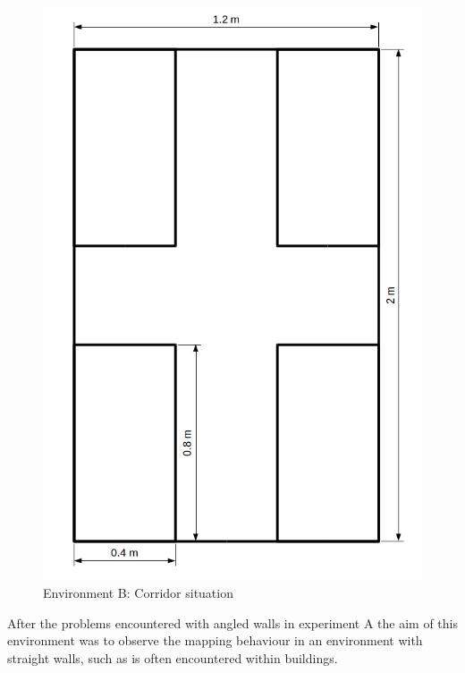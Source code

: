\begin{figure}[h]
\centering
\includegraphics[scale=0.4]{Chapter4/images/experiment_2.png}
\caption{Environment B: Corridor situation}
\label{fig:experiment_b}
\end{figure}

After the problems encountered with angled walls in experiment A the aim of this environment was to observe the mapping behaviour in an environment with straight walls, such as is often encountered within buildings. 

